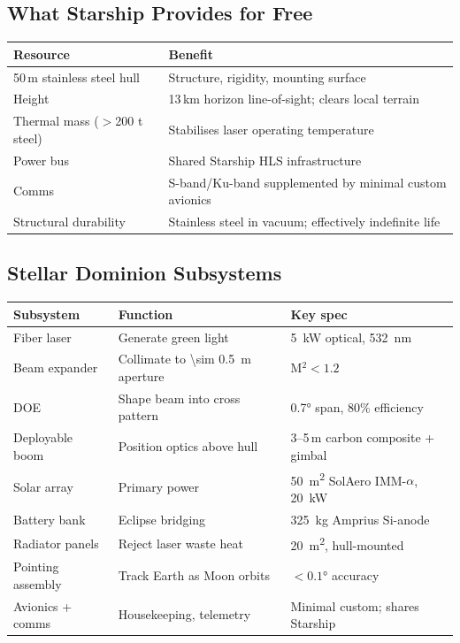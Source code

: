 \documentclass[12pt,letterpaper]{article}
\begin{document}
\subsection{What Starship Provides for Free}

\begin{center}
\begin{tabular}{ll}
\toprule
\textbf{Resource} & \textbf{Benefit} \\
\midrule
50\,m stainless steel hull & Structure, rigidity, mounting surface \\
Height & 13\,km horizon line-of-sight; clears local terrain \\
Thermal mass ($>$200 t steel) & Stabilises laser operating temperature \\
Power bus & Shared Starship HLS infrastructure \\
Comms & S-band/Ku-band supplemented by minimal custom avionics \\
Structural durability & Stainless steel in vacuum; effectively indefinite life \\
\bottomrule
\end{tabular}
\end{center}

\subsection{Stellar Dominion Subsystems}

\begin{center}
\begin{tabular}{lll}
\toprule
\textbf{Subsystem} & \textbf{Function} & \textbf{Key spec} \\
\midrule
Fiber laser & Generate green light & \SI{5}{\kilo\watt} optical, \SI{532}{\nano\meter} \\
Beam expander & Collimate to \SI{\sim 0.5}{\meter} aperture & M$^2 < 1.2$ \\
DOE & Shape beam into cross pattern & \ang{0.7} span, 80\% efficiency \\
Deployable boom & Position optics above hull & 3--5\,m carbon composite + gimbal \\
Solar array & Primary power & \SI{50}{\meter\squared} SolAero IMM-$\alpha$, \SI{20}{\kilo\watt} \\
Battery bank & Eclipse bridging & \SI{325}{\kilo\gram} Amprius Si-anode \\
Radiator panels & Reject laser waste heat & \SI{20}{\meter\squared}, hull-mounted \\
Pointing assembly & Track Earth as Moon orbits & $< \ang{0.1}$ accuracy \\
Avionics + comms & Housekeeping, telemetry & Minimal custom; shares Starship \\
\bottomrule
\end{tabular}
\end{center}
\end{document}
